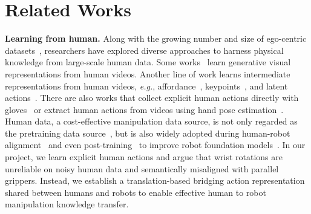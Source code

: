 \documentclass{llmxive}
\providecommand{\myparagraph}[1]{\vspace{0.1em}\noindent\textbf{#1}}
\begin{document}
\section{Related Works}

\myparagraph{Learning from human.}
% 
Along with the growing number and size of ego-centric datasets~\cite{zhou2018towards,goyal2017something,miech2019howto100m,damen2018scaling,grauman2022ego4d,grauman2024ego,hoque2025egodex}, researchers have explored diverse approaches to harness physical knowledge from large-scale human data.
% 
Some works~\cite{cheang2024gr,wu2023unleashing,hu2024video,li2026causal} learn generative visual representations from human videos.
% 
Another line of work learns intermediate representations from human videos, \textit{e.g.}, affordance~\cite{bahl2023affordances,bahl2022human}, keypoints~\cite{wang2023mimicplay,wen2023any,bharadhwaj2024track2act}, and latent actions~\cite{bruce2024genie,ye2024latent,bu2025agibot,chen2025moto,fan2025xr,bjorck2025gr00t}.
% 
There are also works that collect explicit human actions directly with gloves~\cite{xu2025dexumi,tao2025dexwild} or extract human actions from videos using hand pose estimation~\cite{kareer2025emergence,kareer2025egomimic,punamiya2025egobridge,zhu2026emma,luo2026being,luo2025being}.
% 
Human data, a cost-effective manipulation data source, is not only regarded as the pretraining data source~\cite{zheng2026egoscale,cheang2024gr,bjorck2025gr00t}, but is also widely adopted during human-robot alignment~\cite{kareer2025egomimic,punamiya2025egobridge,zhu2026emma,shi2026egohumanoid} and even post-training~\cite{ye2026world,cheang2025gr3,kareer2025emergence} to improve robot foundation models~\cite{black2024pi_0,intelligence2025pi_0.5,ye2026world}.
% 
In our project, we learn explicit human actions and argue that wrist rotations are unreliable on noisy human data and semantically misaligned with parallel grippers.
% 
Instead, we establish a translation-based bridging action representation shared between humans and robots to enable effective human to robot manipulation knowledge transfer.
\end{document}
